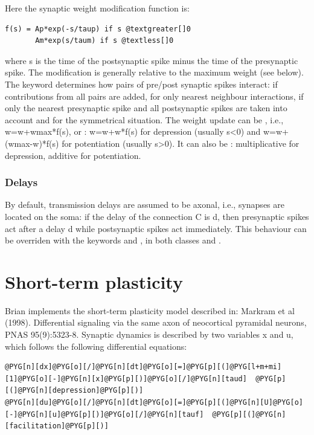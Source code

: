 \documentclass[letterpaper,10pt,english]{manual}
\begin{document}
Here the synaptic weight modification function is:

\begin{Verbatim}[commandchars=@\[\]]
f(s) = Ap*exp(-s/taup) if s @textgreater[]0
       Am*exp(s/taum) if s @textless[]0
\end{Verbatim}

where s is the time of the postsynaptic spike minus the time of the presynaptic spike.
The modification is generally relative to the maximum weight  (see below).
The  keyword determines
how pairs of pre/post synaptic spikes interact:  if contributions from
all pairs are added,  for only nearest neighbour interactions,
 if only the nearest presynaptic spike and all postsynaptic
spikes are taken into account and  for the symmetrical situation.
The weight update can be , i.e., w=w+wmax*f(s), or :
w=w+w*f(s) for depression (usually s\textless{}0) and w=w+(wmax-w)*f(s) for potentiation
(usually s\textgreater{}0). It can also be : multiplicative for depression, additive for
potentiation.


\subsubsection{Delays}

By default, transmission delays are assumed to be axonal, i.e., synapses are located
on the soma: if the delay of the connection C is d, then presynaptic spikes act after
a delay d while postsynaptic spikes act immediately. This behaviour can be overriden with
the keywords  and , in both classes  and
.

\resetcurrentobjects
\hypertarget{--doc-stp}{}

\section{Short-term plasticity}

Brian implements the short-term plasticity model described in:
Markram et al (1998). Differential signaling via the same axon of neocortical
pyramidal neurons, PNAS 95(9):5323-8.
Synaptic dynamics is described by two variables x and u, which
follows the following differential equations:

\begin{Verbatim}[commandchars=@\[\]]
@PYG[n][dx]@PYG[o][/]@PYG[n][dt]@PYG[o][=]@PYG[p][(]@PYG[l+m+mi][1]@PYG[o][-]@PYG[n][x]@PYG[p][)]@PYG[o][/]@PYG[n][taud]  @PYG[p][(]@PYG[n][depression]@PYG[p][)]
@PYG[n][du]@PYG[o][/]@PYG[n][dt]@PYG[o][=]@PYG[p][(]@PYG[n][U]@PYG[o][-]@PYG[n][u]@PYG[p][)]@PYG[o][/]@PYG[n][tauf]  @PYG[p][(]@PYG[n][facilitation]@PYG[p][)]
\end{Verbatim}
\end{document}
